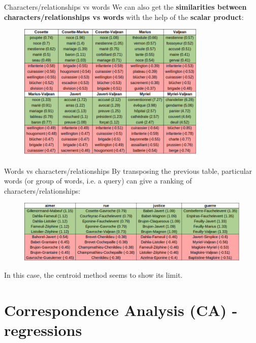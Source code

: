 \documentclass[10pt]{beamer}
\newcommand{\imp}[1]{\textbf{\color{cyan}#1}}
\begin{document}
	
	\begin{frame}{Characters/relationships vs words}
		We can also get the \imp{similarities between characters/relationships vs words} with the help of the \imp{scalar product}:
		\begin{figure}
			\centering
			\includegraphics[width=0.8\textwidth]{img/relationships_vs_words.png}
		\end{figure}
	\end{frame}
	
	
	\begin{frame}{Words vs characters/relationships}
		By transposing the previous table, particular words (or group of words, i.e. a query) can give a ranking of characters/relationships:
		\begin{figure}
			\centering
			\includegraphics[width=\textwidth]{img/word_vs_occ.png}
		\end{figure}
		In this case, the centroid method seems to show its limit.
	\end{frame}
	
	
	
	\section[Correspondence Analysis (CA) - regressions]{Correspondence Analysis (CA) - regressions}
	
\end{document}
